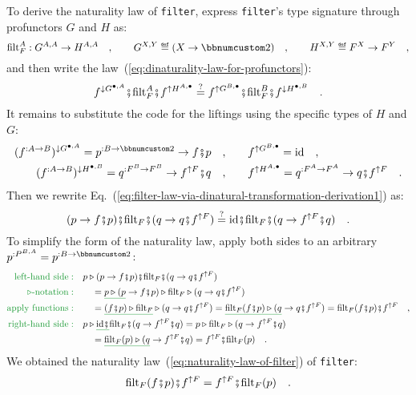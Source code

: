 To derive the naturality law of \lstinline!filter!, express \lstinline!filter!\textsf{'}s
type signature through profunctors $G$ and $H$ as:
\[
\text{filt}_{F}^{A}:G^{A,A}\rightarrow H^{A,A}\quad,\quad\quad G^{X,Y}\triangleq(X\rightarrow\bbnum 2)\quad,\quad\quad H^{X,Y}\triangleq F^{X}\rightarrow F^{Y}\quad,
\]
and then write the law~(\ref{eq:dinaturality-law-for-profunctors}):
\begin{equation}
f^{\downarrow G^{\bullet,A}}\bef\text{filt}_{F}^{A}\bef f^{\uparrow H^{A,\bullet}}\overset{?}{=}f^{\uparrow G^{B,\bullet}}\bef\text{filt}_{F}^{B}\bef f^{\downarrow H^{\bullet,B}}\quad.\label{eq:filter-law-via-dinatural-transformation-derivation1}
\end{equation}
It remains to substitute the code for the liftings using the specific
types of $H$ and $G$:
\begin{align*}
(f^{:A\rightarrow B})^{\downarrow G^{\bullet,A}}=p^{:B\rightarrow\bbnum 2}\rightarrow f\bef p\quad, & \quad\quad f^{\uparrow G^{B,\bullet}}=\text{id}\quad,\\
(f^{:A\rightarrow B})^{\downarrow H^{\bullet,B}}=q^{:F^{B}\rightarrow F^{B}}\rightarrow f^{\uparrow F}\bef q\quad, & \quad\quad f^{\uparrow H^{A,\bullet}}=q^{:F^{A}\rightarrow F^{A}}\rightarrow q\bef f^{\uparrow F}\quad.
\end{align*}
Then we rewrite Eq.~(\ref{eq:filter-law-via-dinatural-transformation-derivation1})
as:
\[
(p\rightarrow f\bef p)\bef\text{filt}_{F}\bef(q\rightarrow q\bef f^{\uparrow F})\overset{?}{=}\text{id}\bef\text{filt}_{F}\bef(q\rightarrow f^{\uparrow F}\bef q)\quad.
\]
To simplify the form of the naturality law, apply both sides to an
arbitrary $p^{:P^{B,A}}=p^{:B\rightarrow\bbnum 2}$:
\begin{align*}
{\color{greenunder}\text{left-hand side}:}\quad & p\triangleright(p\rightarrow f\bef p)\bef\text{filt}_{F}\bef(q\rightarrow q\bef f^{\uparrow F})\\
{\color{greenunder}\triangleright\text{-notation}:}\quad & \quad=\gunderline{p\triangleright(p}\rightarrow f\bef p)\triangleright\text{filt}_{F}\triangleright(q\rightarrow q\bef f^{\uparrow F})\\
{\color{greenunder}\text{apply functions}:}\quad & \quad=\gunderline{(f\bef p)\triangleright\text{filt}_{F}}\triangleright(q\rightarrow q\bef f^{\uparrow F})=\gunderline{\text{filt}_{F}(f\bef p)\triangleright(q}\rightarrow q\bef f^{\uparrow F})=\text{filt}_{F}(f\bef p)\bef f^{\uparrow F}\quad,\\
{\color{greenunder}\text{right-hand side}:}\quad & p\triangleright\gunderline{\text{id}\bef}\text{filt}_{F}\bef(q\rightarrow f^{\uparrow F}\bef q)=p\triangleright\text{filt}_{F}\triangleright(q\rightarrow f^{\uparrow F}\bef q)\\
 & \quad=\gunderline{\text{filt}_{F}(p)\triangleright(q}\rightarrow f^{\uparrow F}\bef q)=f^{\uparrow F}\bef\text{filt}_{F}(p)\quad.
\end{align*}
We obtained the naturality law~(\ref{eq:naturality-law-of-filter})
of \lstinline!filter!:
\[
\text{filt}_{F}(f\bef p)\bef f^{\uparrow F}=f^{\uparrow F}\bef\text{filt}_{F}(p)\quad.
\]


